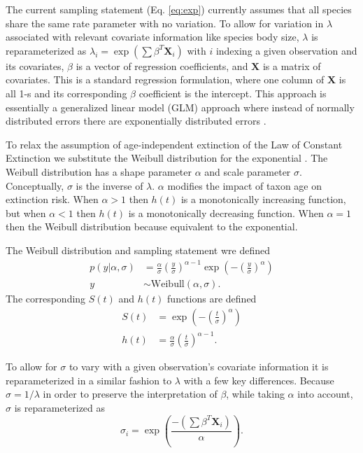 \documentclass{article}
\begin{document}
The current sampling statement (Eq. \ref{eq:exp}) currently assumes that all species share the same rate parameter with no variation. To allow for variation in \(\lambda\) associated with relevant covariate information like species body size, \(\lambda\) is reparameterized as \(\lambda_{i} = \exp(\sum \beta^{T}\mathbf{X}_{i})\) with \(i\) indexing a given observation and its covariates, \(\beta\) is a vector of regression coefficients, and \(\mathbf{X}\) is a matrix of covariates. This is a standard regression formulation, where one column of \(\mathbf{X}\) is all 1-s and its corresponding \(\beta\) coefficient is the intercept. This approach is essentially a generalized linear model (GLM) approach where instead of normally distributed errors there are exponentially distributed errors \cite{Klein2003}.

To relax the assumption of age-independent extinction of the Law of Constant Extinction we substitute the Weibull distribution for the exponential \cite{Klein2003}. The Weibull distribution has a shape parameter \(\alpha\) and scale parameter \(\sigma\). Conceptually, \(\sigma\) is the inverse of \(\lambda\). \(\alpha\) modifies the impact of taxon age on extinction risk. When \(\alpha > 1\) then \(h(t)\) is a monotonically increasing function, but when \(\alpha < 1\) then \(h(t)\) is a monotonically decreasing function. When \(\alpha = 1\) then the Weibull distribution because equivalent to the exponential.

The Weibull distribution and sampling statement wre defined
\begin{align}
  p(y | \alpha, \sigma) &= \frac{\alpha}{\sigma} \left(\frac{y}{\sigma}\right)^{\alpha - 1} \exp\left(-\left(\frac{y}{\sigma}\right)^{\alpha}\right) \nonumber \\
  y &\sim \mathrm{Weibull}(\alpha, \sigma).
  \label{eq:weibull}
\end{align}
The corresponding \(S(t)\) and \(h(t)\) functions are defined
\begin{align}
  S(t) &= \exp\left(-\left(\frac{t}{\sigma}\right)^{\alpha}\right) \label{eq:wei_surv} \\
  h(t) &= \frac{\alpha}{\sigma}\left(\frac{t}{\sigma}\right)^{\alpha - 1} \label{eq:wei_haz}.
\end{align}

To allow for \(\sigma\) to vary with a given observation's covariate information it is reparameterized in a similar fashion to \(\lambda\) with a few key differences. Because \(\sigma = 1/\lambda\) in order to preserve the interpretation of \(\beta\), while taking \(\alpha\) into account, \(\sigma\) is reparameterized as
\begin{equation}
  \sigma_{i} = \exp\left(\frac{-(\sum \beta^{T}\mathbf{X}_{i})}{\alpha}\right).
  \label{eq:reg}
\end{equation}
\end{document}

